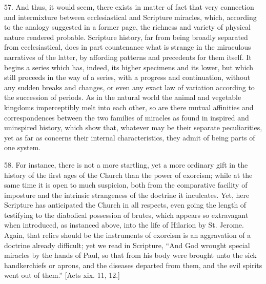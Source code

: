 57.
And thus, it would seem, there exists in matter of fact that very
connection and intermixture between ecclesiastical and Scripture
miracles, which, according to the analogy suggested in a former page,
the richness and variety of physical nature rendered probable.
Scripture history, far from being broadly separated from
ecclesiastical, does in part countenance what is strange in the
miraculous narratives of the latter, by affording patterns and
precedents for them itself. It begins a series which has, indeed, its
higher specimens and its lower, but which still proceeds in the way of
a series, with a progress and continuation, without any sudden
breaks and changes, or even any exact law of variation according to
the succession of periods. As in the natural world the animal and
vegetable kingdoms imperceptibly melt into each other, so are there
mutual affinities and correspondences between the two families of
miracles as found in inspired and uninspired history, which show that,
whatever may be their separate peculiarities, yet as far as concerns
their internal characteristics, they admit of being parts of one
system.

58.
For instance, there is not a more startling, yet a more ordinary gift
in the history of the first ages of the Church than the power of
exorcism; while at the same time it is open to much suspicion, both
from the comparative facility of imposture and the intrinsic
strangeness of the doctrine it inculcates. Yet, here Scripture has
anticipated the Church in all respects, even going the length of
testifying to the diabolical possession of brutes, which appears so
extravagant when introduced, as instanced above, into the life of
Hilarion by St. Jerome. Again, that relics should be the instruments
of exorcism is an aggravation of a doctrine already difficult; yet we
read in Scripture, ``And God wrought special miracles by the hands of
Paul, so that from his body were brought unto the sick handkerchiefs
or aprons, and the diseases departed from them, and the evil spirits
went out of them.'' [Acts xix. 11, 12.]

